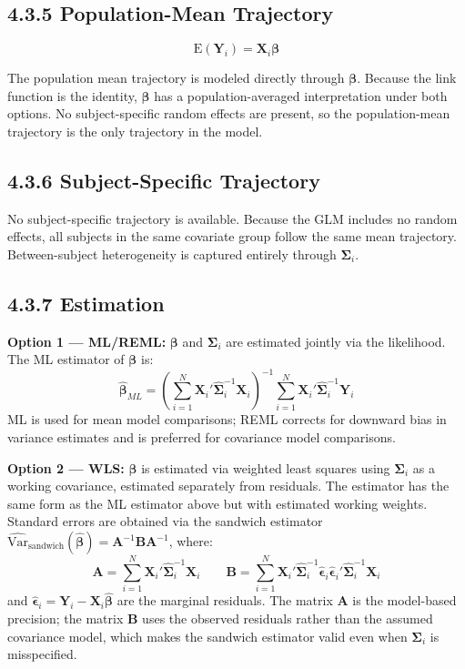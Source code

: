 \documentclass[11pt]{article}
\newcommand{\bY}{\mathbf{Y}}
\newcommand{\bX}{\mathbf{X}}
\newcommand{\bbeta}{\boldsymbol{\beta}}
\newcommand{\bepsilon}{\boldsymbol{\epsilon}}
\newcommand{\bSigma}{\boldsymbol{\Sigma}}
\newcommand{\E}{\mathrm{E}}
\newcommand{\Var}{\mathrm{Var}}
\begin{document}
\subsection*{4.3.5 Population-Mean Trajectory}

$$\E(\bY_i) = \bX_i \bbeta$$

The population mean trajectory is modeled directly through $\bbeta$. Because the link function is the identity, $\bbeta$ has a population-averaged interpretation under both options. No subject-specific random effects are present, so the population-mean trajectory is the only trajectory in the model.

\subsection*{4.3.6 Subject-Specific Trajectory}

No subject-specific trajectory is available. Because the GLM includes no random effects, all subjects in the same covariate group follow the same mean trajectory. Between-subject heterogeneity is captured entirely through $\bSigma_i$.

\subsection*{4.3.7 Estimation}

\textbf{Option 1 --- ML/REML:} $\bbeta$ and $\bSigma_i$ are estimated jointly via the likelihood. The ML estimator of $\bbeta$ is:
$$\hat{\bbeta}_{ML} = \left(\sum_{i=1}^N \bX_i'\hat{\bSigma}_i^{-1}\bX_i\right)^{-1}\sum_{i=1}^N \bX_i'\hat{\bSigma}_i^{-1}\bY_i$$
ML is used for mean model comparisons; REML corrects for downward bias in variance estimates and is preferred for covariance model comparisons.

\textbf{Option 2 --- WLS:} $\bbeta$ is estimated via weighted least squares using $\bSigma_i$ as a working covariance, estimated separately from residuals. The estimator has the same form as the ML estimator above but with estimated working weights. Standard errors are obtained via the sandwich estimator $\widehat{\Var}_{\text{sandwich}}(\hat{\bbeta}) = \mathbf{A}^{-1}\mathbf{B}\mathbf{A}^{-1}$, where:
$$\mathbf{A} = \sum_{i=1}^N \bX_i'\hat{\bSigma}_i^{-1}\bX_i \qquad \mathbf{B} = \sum_{i=1}^N \bX_i'\hat{\bSigma}_i^{-1}\hat{\bepsilon}_i\hat{\bepsilon}_i'\hat{\bSigma}_i^{-1}\bX_i$$
and $\hat{\bepsilon}_i = \bY_i - \bX_i\hat{\bbeta}$ are the marginal residuals. The matrix $\mathbf{A}$ is the model-based precision; the matrix $\mathbf{B}$ uses the observed residuals rather than the assumed covariance model, which makes the sandwich estimator valid even when $\bSigma_i$ is misspecified.
\end{document}
